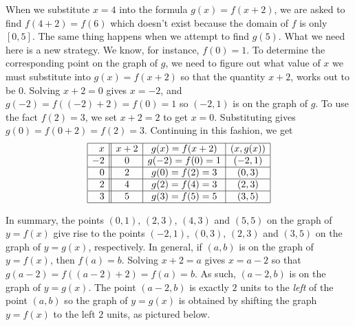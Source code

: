When we substitute $x=4$ into the formula $g(x)=f(x+2)$, we are asked to find $f(4+2)=f(6)$ which doesn't exist because the domain of $f$ is only $[0,5]$.  The same thing happens when we attempt to find $g(5)$.  What we need here is a new strategy.  We know, for instance, $f(0) = 1$.  To determine the corresponding point on the graph of $g$, we need to figure out what value of $x$ we must substitute into $g(x) = f(x+2)$ so that the quantity $x+2$, works out to be $0$.  Solving $x+2=0$ gives $x=-2$, and $g(-2) = f((-2)+2) = f(0) = 1$ so  $(-2,1)$ is on the graph of $g$.  To use the fact $f(2) = 3$, we set $x+2 = 2$ to get $x=0$. Substituting gives $g(0) = f(0+2) = f(2) = 3$.  Continuing in this fashion, we get  \[ \begin{array}{|r||c|c|c|}  

\hline

x & x+2 & g(x)=f(x+2) & (x, g(x)) \\ \hline
-2 & 0 & g(-2)=f(0) = 1   &(-2, 1) \\  \hline
0 &  2 &  g(0)=f(2) = 3  &(0,3) \\  \hline
2 & 4  & g(2)=f(4) = 3 &  (2,3)\\  \hline
3 & 5 & g(3)=f(5) = 5  & (3,5) \\  \hline

\end{array} \] 

In summary, the points $(0,1)$, $(2,3)$, $(4,3)$ and $(5,5)$ on the graph of $y=f(x)$ give rise to the points  $(-2,1)$, $(0,3)$, $(2,3)$ and $(3,5)$ on the graph of $y=g(x)$, respectively.  In general, if $(a,b)$ is on the graph of $y=f(x)$, then $f(a) = b$.  Solving $x+2 = a$ gives $x = a-2$ so that $g(a-2) = f((a-2)+2) = f(a) = b$.  As such, $(a-2,b)$ is on the graph of $y=g(x)$. The point $(a-2,b)$ is exactly $2$ units to the \emph{left} of the point $(a,b)$ so the graph of $y=g(x)$ is obtained by shifting the graph $y=f(x)$ to the left $2$ units, as pictured below.

